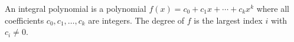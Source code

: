 An integral polynomial is a polynomial $f(x) = c_0 + c_1 x + \cdots + c_k x^k$ where all coefficients $c_0, c_1, \ldots, c_k$ are integers. The degree of $f$ is the largest index $i$ with $c_i \neq 0$.
